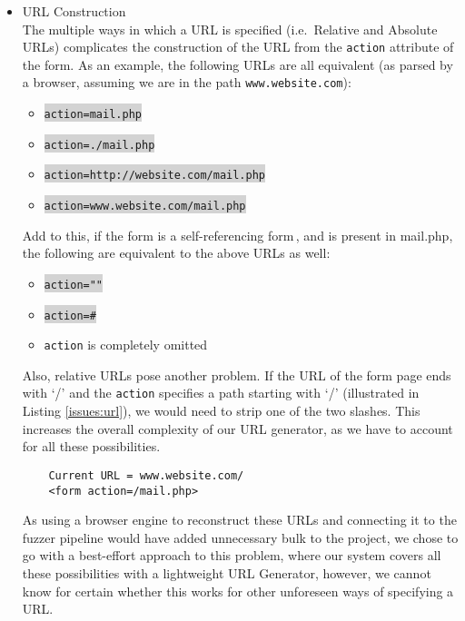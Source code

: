 \begin{itemize}
	\item URL Construction\\
	The multiple ways in which a URL is specified (i.e.\ Relative and Absolute URLs) complicates the construction of the URL from the \texttt{action} attribute of the form.  As an example, the following URLs are all equivalent (as parsed by a browser, assuming we are in the path \texttt{www.website.com}):
	
	\begin{itemize}
		\item \colorbox{lightgray}{\lstinline{action=mail.php}}
		\item \colorbox{lightgray}{\lstinline{action=./mail.php}}
		\item \colorbox{lightgray}{\lstinline{action=http://website.com/mail.php}}
		\item \colorbox{lightgray}{\lstinline{action=www.website.com/mail.php}}
	\end{itemize}
	Add to this, if the form is a self-referencing form\,\footnotemark, and is present in mail.php, the following are equivalent to the above URLs as well:
	\begin{itemize}
		\item \colorbox{lightgray}{\lstinline{action=""}}
		\item \colorbox{lightgray}{\lstinline{action=#}}
		\item \texttt{action} is completely omitted
	\end{itemize}
	Also, relative URLs pose another problem. If the URL of the form page ends with `/' and the \texttt{action} specifies a path starting with `/' (illustrated in Listing \ref{issues:url}), we would need to strip one of the two slashes. This increases the overall complexity of our URL generator, as we have to account for all these possibilities.
		
	\begin{lstlisting}
	Current URL = www.website.com/
	<form action=/mail.php>
	\end{lstlisting}
	
	As using a browser engine to reconstruct these URLs  and connecting it to the fuzzer pipeline would have added unnecessary bulk to the project, we chose to go with a best-effort approach to this problem, where our system covers all these possibilities with a lightweight URL Generator, however, we cannot know for certain whether this works for other unforeseen ways of specifying a URL.
	

\end{itemize}

